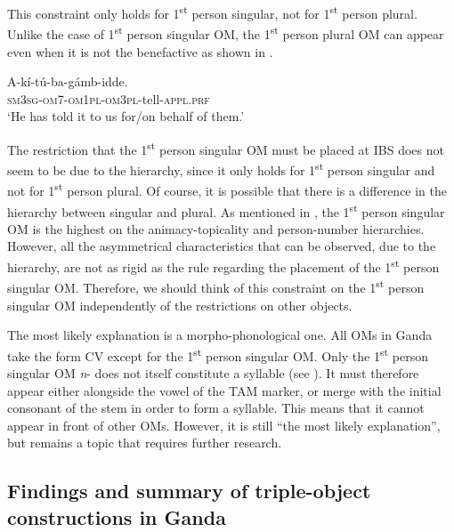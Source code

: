 \documentclass[output=paper,
            colorlinks, citecolor=brown
            ,draftmode
		  ]{langscibook}
\begin{document}
    This constraint only holds for 1\textsuperscript{st} person singular, not for 1\textsuperscript{st} person plural. Unlike the case of 1\textsuperscript{st} person singular OM, the 1\textsuperscript{st} person plural OM can appear even when it is not the benefactive as shown in .   


\ea%
    \label{ex:yoneda:56}
    \gll A-kí-tú-ba-gámb-idde.\\
         \textsc{sm3sg-om7-om1pl-om3pl}-tell-\textsc{appl.prf} \\
    \glt ‘He has told it to us for/on behalf of them.’
    \z

            

                 

      

    The restriction that the 1\textsuperscript{st} person singular OM must be placed at IBS does not seem to be due to the hierarchy, since it only holds for 1\textsuperscript{st} person singular and not for 1\textsuperscript{st} person plural. Of course, it is possible that there is a difference in the hierarchy between singular and plural. As mentioned in , the 1\textsuperscript{st} person singular OM is the highest on the animacy-topicality and person-number hierarchies. However, all the asymmetrical characteristics that can be observed, due to the hierarchy, are not as rigid as the rule regarding the placement of the 1\textsuperscript{st} person singular OM. Therefore, we should think of this constraint on the 1\textsuperscript{st} person singular OM independently of the restrictions on other objects.  

    The most likely explanation is a morpho-phonological one. All OMs in Ganda take the form CV except for the 1\textsuperscript{st} person singular OM. Only the 1\textsuperscript{st} person singular OM \textit{n}{}- does not itself constitute a syllable (see ). It must therefore appear either alongside the vowel of the TAM marker, or merge with the initial consonant of the stem in order to form a syllable. This means that it cannot appear in front of other OMs. However, it is still ``the most likely explanation'', but remains a topic that requires further research. 

\subsection{Findings and summary of triple-object constructions in Ganda}
\label{sec:yoneda:4.4}
\end{document}

